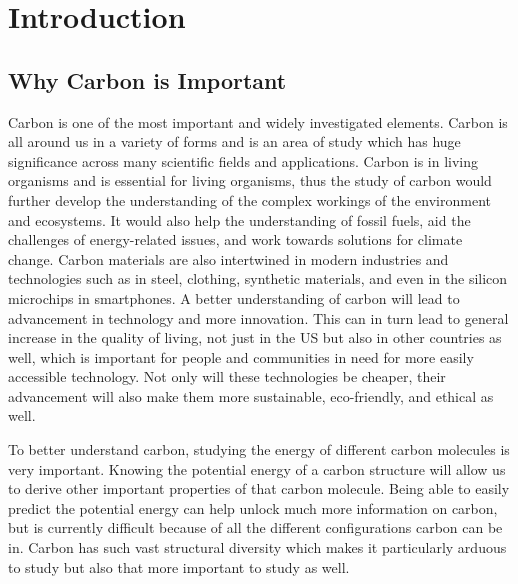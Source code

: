 \documentclass[12pt, abstract = true]{scrartcl}
\begin{document}
\newpage

\section{Introduction}\label{Introduction}

\subsection{Why Carbon is Important}

Carbon is one of the most important and widely investigated
elements. Carbon is all around us in a variety of forms and is an area
of study which has huge significance across many scientific fields and
applications. Carbon is in living organisms and is essential for
living organisms, thus the study of carbon would further develop the understanding of the
complex workings of the environment and ecosystems. It would also help the understanding of 
fossil fuels, aid the challenges of energy-related issues, and work towards solutions for
climate change. Carbon materials are also intertwined in modern industries and technologies 
such as in steel, clothing, synthetic materials, and even in the silicon microchips in smartphones. 
A better understanding of carbon will lead to advancement in technology and more innovation. 
This can in turn lead to general increase in the quality of living, not just in the US but also 
in other countries as well, which is important for people and communities in need for more easily accessible technology. 
Not only will these technologies be cheaper, their advancement will also make 
them more sustainable, eco-friendly, and ethical as well.

To better understand carbon, studying the energy of different carbon molecules is very important. 
Knowing the potential energy of a carbon structure will allow us to derive other important properties 
of that carbon molecule. Being able to easily predict the potential energy can help unlock much more 
information on carbon, but is currently difficult because of all the different configurations carbon 
can be in. Carbon has such vast structural diversity which makes it particularly arduous to study but 
also that more important to study as well.
\end{document}
